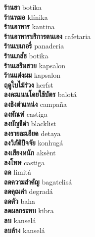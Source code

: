 \textbf{ ร้านยา  } botika \\
\textbf{ ร้านหมอ  } klínika \\
\textbf{ ร้านอาหาร  } kantina \\
\textbf{ ร้านอาหารบริการตนเอง  } cafetaria \\
\textbf{ ร้านเบเกอรี่  } panaderia \\
\textbf{ ร้านเภสัช  } botika \\
\textbf{ ร้านเสริมสวย  } kapsalon \\
\textbf{ ร้านแต่งผม  } kapsalon \\
\textbf{ ฤดูใบไม้ร่วง  } herfst \\
\textbf{ ลงคะแนนโดยใช้บัตร  } balotá \\
\textbf{ ลงชิงตำแหน่ง  } campaña \\
\textbf{ ลงทัณฑ์  } castiga \\
\textbf{ ลงบัญชีดำ  } blacklist \\
\textbf{ ลงรายละเอียด  } detaya \\
\textbf{ ลงวิภัติปัจจัย  } konhugá \\
\textbf{ ลงเสียงหนัก  } aksènt \\
\textbf{ ลงโทษ  } castiga \\
\textbf{ ลด  } limitá \\
\textbf{ ลดความสำคัญ  } bagatelisá \\
\textbf{ ลดคุณค่า  } degradá \\
\textbf{ ลดตัว  } baha \\
\textbf{ ลดผลกระทบ  } kibra \\
\textbf{ ลบ  } kanselá \\
\textbf{ ลบล้าง  } kanselá \\
